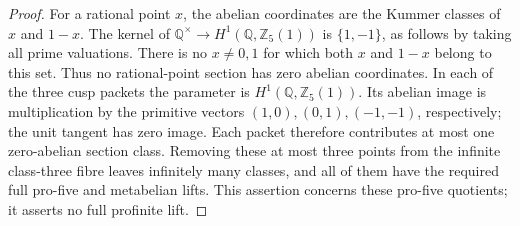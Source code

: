 \begin{proof}
For a rational point \(x\), the abelian coordinates are
the Kummer classes of \(x\) and \(1-x\).
The kernel of
\(\mathbb Q^\times\to H^1(\mathbb Q,\mathbb Z_5(1))\)
is \(\{1,-1\}\), as follows by taking all prime valuations.
There is no \(x\ne0,1\) for which both \(x\) and \(1-x\)
belong to this set. Thus no rational-point section has
zero abelian coordinates. In each of the three cusp
packets the parameter is
\(H^1(\mathbb Q,\mathbb Z_5(1))\). Its abelian image is
multiplication by the primitive vectors
\((1,0),(0,1),(-1,-1)\), respectively; the unit tangent
has zero image. Each packet therefore contributes at most
one zero-abelian section class. Removing these at most
three points from the infinite class-three fibre leaves
infinitely many classes, and all of them have the required
full pro-five and metabelian lifts. This assertion concerns
these pro-five quotients; it asserts no full profinite lift.
\end{proof}

